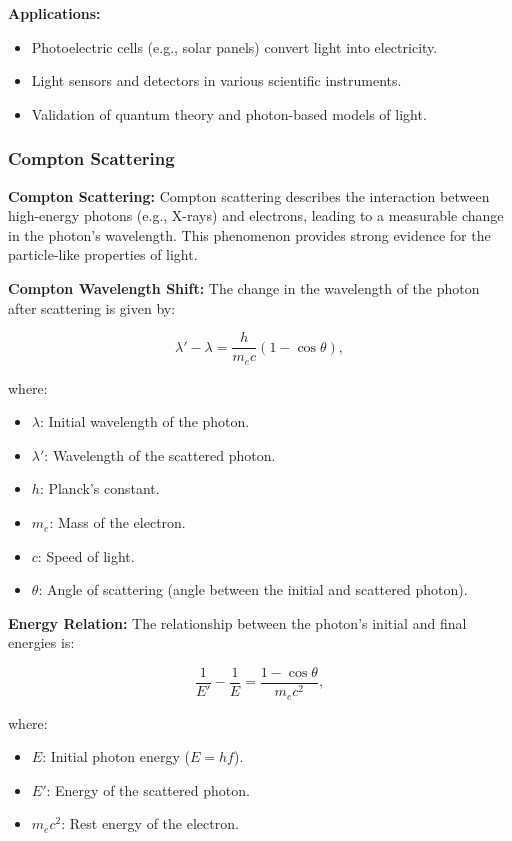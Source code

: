 \documentclass{article}
\newcommand{\eqbox}[1]{\begin{tcolorbox}[colback=gray!10] #1 \end{tcolorbox}}
\newcommand{\conceptbox}[1]{\begin{tcolorbox}[colback=blue!10] #1 \end{tcolorbox}}
\begin{document}
\conceptbox{
\textbf{Applications:}
\begin{itemize}
    \item Photoelectric cells (e.g., solar panels) convert light into electricity.
    \item Light sensors and detectors in various scientific instruments.
    \item Validation of quantum theory and photon-based models of light.
\end{itemize}
}
\newpage
\subsubsection{Compton Scattering}

\conceptbox{
\textbf{Compton Scattering:}
Compton scattering describes the interaction between high-energy photons (e.g., X-rays) and electrons, leading to a measurable change in the photon's wavelength. This phenomenon provides strong evidence for the particle-like properties of light.
}

\conceptbox{
\textbf{Compton Wavelength Shift:}
The change in the wavelength of the photon after scattering is given by:
\eqbox{
\[
\lambda' - \lambda = \frac{h}{m_ec}(1 - \cos\theta),
\]
}
where:
\begin{itemize}
    \item \( \lambda \): Initial wavelength of the photon.
    \item \( \lambda' \): Wavelength of the scattered photon.
    \item \( h \): Planck's constant.
    \item \( m_e \): Mass of the electron.
    \item \( c \): Speed of light.
    \item \( \theta \): Angle of scattering (angle between the initial and scattered photon).
\end{itemize}
}

\conceptbox{
\textbf{Energy Relation:}
The relationship between the photon's initial and final energies is:
\eqbox{
\[
\frac{1}{E'} - \frac{1}{E} = \frac{1 - \cos\theta}{m_ec^2},
\]
}
where:
\begin{itemize}
    \item \( E \): Initial photon energy (\( E = hf \)).
    \item \( E' \): Energy of the scattered photon.
    \item \( m_ec^2 \): Rest energy of the electron.
\end{itemize}
}
\end{document}
